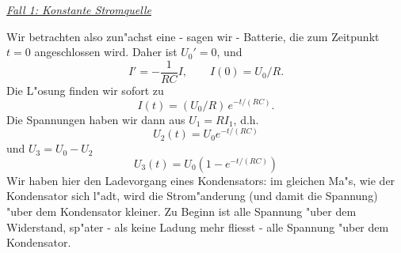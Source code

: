 \underline{{\it Fall 1: Konstante Stromquelle}}\par
Wir betrachten also zun"achst eine - sagen wir - Batterie, die zum Zeitpunkt $t=0$ angeschlossen wird. Daher ist
$U_0'=0$, und
$$  I'  =  - \frac 1{R C} I, \qquad I(0) = U_0/R. $$
Die L"osung finden wir sofort zu
$$ I(t) = (U_0/R)\, e^{-t/(RC)}.$$
Die Spannungen haben wir dann aus $U_1=RI_1$, d.h.
$$ U_2(t) = U_0 e^{-t/(RC)}$$
und $U_3 = U_0-U_2$
$$ U_3(t) = U_0 \left(1-e^{-t/(RC)}\right)$$
Wir haben hier den Ladevorgang eines Kondensators: im gleichen Ma"s,
wie der Kondensator sich l"adt, wird die Strom"anderung (und damit die Spannung) "uber dem Kondensator kleiner.
Zu Beginn ist alle Spannung "uber dem Widerstand, sp"ater - als keine Ladung mehr fliesst - 
alle Spannung "uber dem Kondensator.


